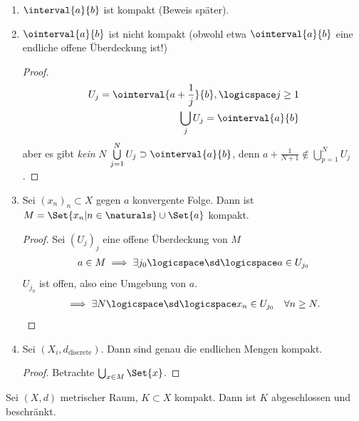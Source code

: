 \begin{beispiele}
    \begin{enumerate}
        \item \( \interval{a}{b} \) ist kompakt (Beweis später).
        \item \( \ointerval{a}{b} \) ist nicht kompakt (obwohl etwa \( \ointerval{a}{b} \) eine endliche offene Überdeckung ist!)
        \begin{proof}
            \begin{align*}
                U_j=\ointerval{a+\frac{1}{j}}{b},\logicspace j\geq 1\\
                \bigcup_j U_j=\ointerval{a}{b} 
            \end{align*}
            aber es gibt \emph{kein} \( N\) \sd
                \( \bigcup\limits_{j=1}^{N}U_j\supset \ointerval{a}{b} \), denn \zb \( a+\frac{1}{N+1}\notin \bigcup_{p=1}^{N}U_j \).  
        \end{proof}
        
        \item Sei \( (x_n)_n\subset X\) gegen \( a\) konvergente Folge. Dann ist \( M=\Set{x_n|n\in \naturals }\cup \Set{a}\) kompakt.
        \begin{proof}
            Sei \( (U_j)_j\) eine offene Überdeckung von \( M\)
            \begin{align*}
                a\in M\implies \exists j_0\logicspace\text{\sd} \logicspace a\in U_{j_0}
            \end{align*} 
            \( U_{j_0}\) ist offen, also eine Umgebung von \( a\).
            \begin{align*}
                \implies \exists N\logicspace\text{\sd} \logicspace  x_n\in U_{j_0}\quad \forall n\geq N.
            \end{align*}
        \end{proof}
        
        \item Sei \( (X_i,d_{\text{discrete}})\). Dann sind genau die endlichen Mengen kompakt.
        \begin{proof}
            Betrachte \( \bigcup_{x\in M} \Set{x}\). 
        \end{proof}        
    \end{enumerate}
\end{beispiele}
\begin{satz}\label{kompakt:abgeschlossen_beschraenkt}
    Sei \( (X,d)\) metrischer Raum, \( K\subset X\) kompakt. Dann ist \( K\) abgeschlossen und beschränkt. 
\end{satz}
